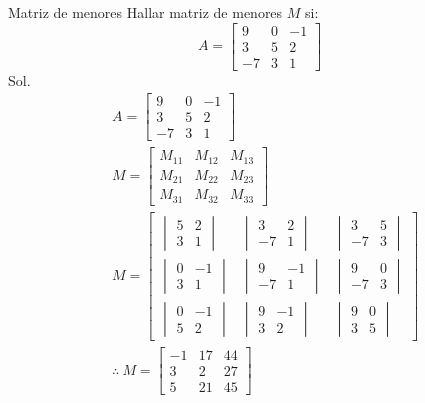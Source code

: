 \begin{Example*} {Matriz de menores}
	Hallar matriz de menores $M$ si:
	$$ A=\begin{bmatrix}
		9&0&-1\\
		3&5&2\\
		-7&3&1
	\end{bmatrix} $$
	Sol.
	\begin{align*}
		&A=\begin{bmatrix}
			9&0&-1\\
			3&5&2\\
			-7&3&1
		\end{bmatrix}\\
		&M=\begin{bmatrix}
			M_{11}&M_{12}&M_{13}\\
			M_{21}&M_{22}&M_{23}\\
			M_{31}&M_{32}&M_{33}
		\end{bmatrix}\\
		&M=\begin{bmatrix}
			\begin{vmatrix}
				5&2\\
				3&1
			\end{vmatrix}&\begin{vmatrix}
				3&2\\
				-7&1
			\end{vmatrix}&\begin{vmatrix}
				3&5\\
				-7&3
			\end{vmatrix}\\
			\begin{vmatrix}
				0&-1\\
				3&1
			\end{vmatrix}&\begin{vmatrix}
				9&-1\\
				-7&1
			\end{vmatrix}&\begin{vmatrix}
				9&0\\
				-7&3
			\end{vmatrix}\\
			\begin{vmatrix}
				0&-1\\
				5&2
			\end{vmatrix}&\begin{vmatrix}
				9&-1\\
				3&2
			\end{vmatrix}&\begin{vmatrix}
				9&0\\
				3&5
			\end{vmatrix}
		\end{bmatrix}\\
		&\therefore \ M=\begin{bmatrix}
			-1&17&44\\
			3&2&27\\
			5&21&45
		\end{bmatrix}
	\end{align*}
\end{Example*}
